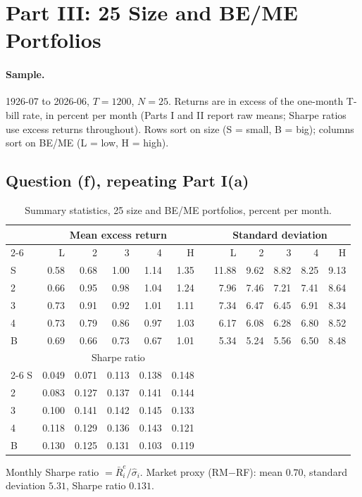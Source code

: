 \section{Part III: 25 Size and BE/ME Portfolios}

\paragraph{Sample.} 1926-07 to 2026-06, $T = 1200$, $N = 25$. Returns are in excess of the one-month T-bill rate, in percent per month (Parts I and II report raw means; Sharpe ratios use excess returns throughout). Rows sort on size
(S = small, B = big); columns sort on BE/ME (L = low, H = high).

\subsection{Question (f), repeating Part I(a)}

\begin{table}[H]
\centering
\caption{Summary statistics, 25 size and BE/ME portfolios, percent per month.}
\small
\begin{tabular}{lrrrrrcrrrrr}
\toprule
& \multicolumn{5}{c}{Mean excess return} && \multicolumn{5}{c}{Standard deviation} \\
\cmidrule{2-6}\cmidrule{8-12}
& L & 2 & 3 & 4 & H && L & 2 & 3 & 4 & H \\
\midrule
S & 0.58 & 0.68 & 1.00 & 1.14 & 1.35 && 11.88 & 9.62 & 8.82 & 8.25 & 9.13 \\
2 & 0.66 & 0.95 & 0.98 & 1.04 & 1.24 &&  7.96 & 7.46 & 7.21 & 7.41 & 8.64 \\
3 & 0.73 & 0.91 & 0.92 & 1.01 & 1.11 &&  7.34 & 6.47 & 6.45 & 6.91 & 8.34 \\
4 & 0.73 & 0.79 & 0.86 & 0.97 & 1.03 &&  6.17 & 6.08 & 6.28 & 6.80 & 8.52 \\
B & 0.69 & 0.66 & 0.73 & 0.67 & 1.01 &&  5.34 & 5.24 & 5.56 & 6.50 & 8.48 \\
\midrule
& \multicolumn{5}{c}{Sharpe ratio} && \multicolumn{5}{c}{} \\
\cmidrule{2-6}
S & 0.049 & 0.071 & 0.113 & 0.138 & 0.148 &&&&&& \\
2 & 0.083 & 0.127 & 0.137 & 0.141 & 0.144 &&&&&& \\
3 & 0.100 & 0.141 & 0.142 & 0.145 & 0.133 &&&&&& \\
4 & 0.118 & 0.129 & 0.136 & 0.143 & 0.121 &&&&&& \\
B & 0.130 & 0.125 & 0.131 & 0.103 & 0.119 &&&&&& \\
\bottomrule
\end{tabular}
\label{tab:p3f_stats}
\vspace{2pt}\begin{minipage}{0.93\textwidth}\footnotesize
Monthly Sharpe ratio $= \bar R^e_i/\hat\sigma_i$. Market proxy (RM$-$RF):
mean $0.70$, standard deviation $5.31$, Sharpe ratio $0.131$.
\end{minipage}
\end{table}

